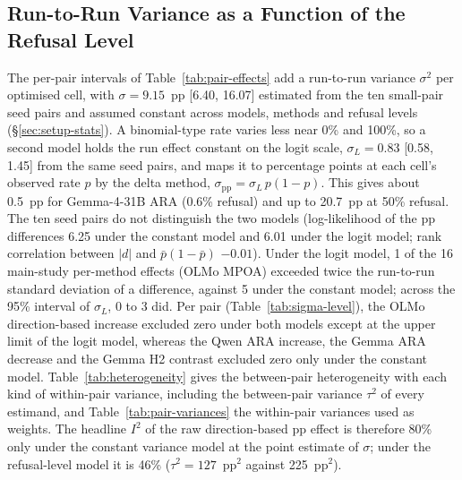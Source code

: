 \clearpage
\subsection{Run-to-Run Variance as a Function of the Refusal Level}
\label{app:sigma-level}

The per-pair intervals of Table~\ref{tab:pair-effects} add a run-to-run
variance $\sigma^2$ per optimised cell, with $\sigma=9.15$~pp [6.40, 16.07]
estimated from the ten small-pair seed pairs and assumed constant across
models, methods and refusal levels (\S\ref{sec:setup-stats}). A binomial-type
rate varies less near 0\% and 100\%, so a second model holds the run effect
constant on the logit scale, $\sigma_L=0.83$ [0.58, 1.45] from the same seed
pairs, and maps it to percentage points at each cell's observed rate $p$ by
the delta method, $\sigma_{\mathrm{pp}}=\sigma_L\,p(1-p)$. This gives about
0.5~pp for Gemma-4-31B ARA (0.6\% refusal) and up to 20.7~pp at 50\% refusal.
The ten seed pairs do not distinguish the two models (log-likelihood of the
pp differences 6.25 under the constant model and 6.01 under the logit model;
rank correlation between $|d|$ and $\bar p(1-\bar p)$ $-0.01$). Under the
logit model, 1 of the 16 main-study per-method effects (OLMo MPOA) exceeded
twice the run-to-run standard deviation of a difference, against 5 under the
constant model; across the 95\% interval of $\sigma_L$, 0 to 3 did. Per pair
(Table~\ref{tab:sigma-level}), the OLMo direction-based increase excluded zero
under both models except at the upper limit of the logit model, whereas the
Qwen ARA increase, the Gemma ARA decrease and the Gemma H2 contrast excluded
zero only under the constant model. Table~\ref{tab:heterogeneity} gives the
between-pair heterogeneity with each kind of within-pair variance, including
the between-pair variance $\tau^2$ of every estimand, and
Table~\ref{tab:pair-variances} the within-pair variances used as weights. The
headline $I^2$ of the raw direction-based pp effect is therefore 80\% only
under the constant variance model at the point estimate of $\sigma$; under
the refusal-level model it is 46\% ($\tau^2=127$~pp$^2$ against 225~pp$^2$).

